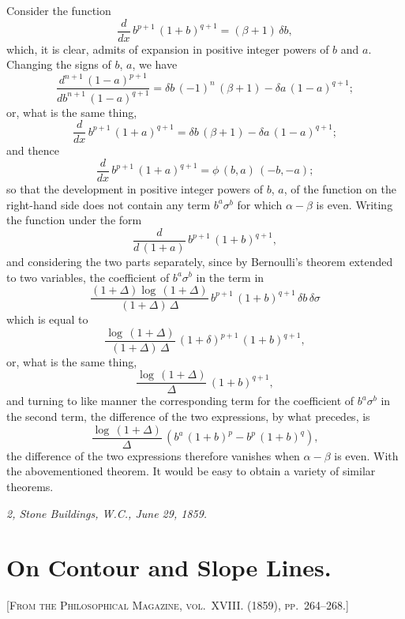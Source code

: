 \documentclass[11pt,a4paper]{book}
\begin{document}
\medskip
Consider the function
\[
\frac{d}{dx}\,b^{p+1}\,(1+b)^{q+1} = (\beta+1)\,\delta b,
\]
which, it is clear, admits of expansion in positive integer powers of $b$ and $a$. Changing the signs of $b$, $a$, we have
\[
\frac{d^{n+1}\,(1-a)^{p+1}}{db^{n+1}\,(1-a)^{q+1}} = \delta b\,(-1)^{n}\,(\beta+1) - \delta a\,(1-a)^{q+1};
\]
or, what is the same thing,
\[
\frac{d}{dx}\,b^{p+1}\,(1+a)^{q+1} = \delta b\,(\beta+1) - \delta a\,(1-a)^{q+1};
\]
and thence
\[
\frac{d}{dx}\,b^{p+1}\,(1+a)^{q+1} = \phi\,(b,a)\,(-b,-a);
\]
so that the development in positive integer powers of $b$, $a$, of the function on the right-hand side does not contain any term $b^a \sigma^b$ for which $\alpha - \beta$ is even. Writing the function under the form
\[
\frac{d}{d\,(1+a)}\,b^{p+1}\,(1+b)^{q+1},
\]
and considering the two parts separately, since by Bernoulli's theorem extended to two variables, the coefficient of $b^a \sigma^b$ in the term in
\[
\frac{(1+\Delta)\log\,(1+\Delta)}{(1+\Delta)\,\Delta}\,b^{p+1}\,(1+b)^{q+1}\,\delta b\,\delta\sigma
\]
which is equal to
\[
\frac{\log\,(1+\Delta)}{(1+\Delta)\,\Delta}\,(1+\delta)^{p+1}\,(1+b)^{q+1},
\]
or, what is the same thing,
\[
\frac{\log\,(1+\Delta)}{\Delta}\,(1+b)^{q+1},
\]
and turning to like manner the corresponding term for the coefficient of $b^a \sigma^b$ in the second term, the difference of the two expressions, by what precedes, is
\[
\frac{\log\,(1+\Delta)}{\Delta}\,(b^a\,(1+b)^p - b^p\,(1+b)^q),
\]
the difference of the two expressions therefore vanishes when $\alpha - \beta$ is even. With the abovementioned theorem. It would be easy to obtain a variety of similar theorems.

\smallskip
\noindent\textit{2, Stone Buildings, W.C., June 29, 1859.}

\newpage


\setcounter{page}{108}

\section*{On Contour and Slope Lines.}
\label{paper:246}

\textsc{[From the Philosophical Magazine, vol.~XVIII. (1859), pp.~264--268.]}
\end{document}
